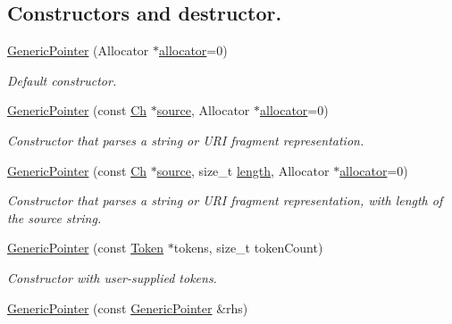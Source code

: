 \subsection*{Constructors and destructor.}
\begin{DoxyCompactItemize}
\item 
\hyperlink{classGenericPointer_a5d85b7dc82719643e8f7adccd5a74fbe}{Generic\+Pointer} (Allocator $\ast$\hyperlink{classGenericPointer_aeb61ba8e67260b43090791eeca8b90e0}{allocator}=0)
\begin{DoxyCompactList}\small\item\em Default constructor. \end{DoxyCompactList}\item 
\hyperlink{classGenericPointer_a4ad549b8a826c3c2dedf03fcc07be9b0}{Generic\+Pointer} (const \hyperlink{classGenericPointer_ab292356c11b4015c98d21b966b11f285}{Ch} $\ast$\hyperlink{pointer_8h_adb82dfe18535e9a30aa97d275f82bd55}{source}, Allocator $\ast$\hyperlink{classGenericPointer_aeb61ba8e67260b43090791eeca8b90e0}{allocator}=0)
\begin{DoxyCompactList}\small\item\em Constructor that parses a string or U\+RI fragment representation. \end{DoxyCompactList}\item 
\hyperlink{classGenericPointer_a9c05684ea95306aac7626e70cb3946cc}{Generic\+Pointer} (const \hyperlink{classGenericPointer_ab292356c11b4015c98d21b966b11f285}{Ch} $\ast$\hyperlink{pointer_8h_adb82dfe18535e9a30aa97d275f82bd55}{source}, size\+\_\+t \hyperlink{imgui__impl__opengl3__loader_8h_a011fc24f10426c01349e94a4edd4b0d5}{length}, Allocator $\ast$\hyperlink{classGenericPointer_aeb61ba8e67260b43090791eeca8b90e0}{allocator}=0)
\begin{DoxyCompactList}\small\item\em Constructor that parses a string or U\+RI fragment representation, with length of the source string. \end{DoxyCompactList}\item 
\hyperlink{classGenericPointer_a524a9921eff68f389a817a20ca7f1d84}{Generic\+Pointer} (const \hyperlink{structGenericPointer_1_1Token}{Token} $\ast$tokens, size\+\_\+t token\+Count)
\begin{DoxyCompactList}\small\item\em Constructor with user-\/supplied tokens. \end{DoxyCompactList}\item 
\hyperlink{classGenericPointer_a7803645e8f7f349ee09c7d50351e9432}{Generic\+Pointer} (const \hyperlink{classGenericPointer}{Generic\+Pointer} \&rhs)

\end{DoxyCompactItemize}
